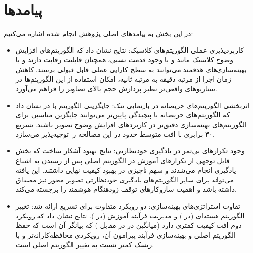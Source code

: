 \section{پیامد‌ها}

در این بخش به پیامد‌های اصلی پژوهش انجام شده اشاره می‌کنیم:

\begin{itemize}
    \item کاربردپذیری عملی الگوریتم‌های کلاسیک: نتایج نشان داد که الگوریتم‌های افزایش وضوح کلاسیک مانند  و  با وجود قدمت نسبی، همچنان قابلیت رقابت دارند و با بهینه‌سازی‌های هدفمند می‌توانند به سطح کارایی عملی قابل قبولی برسند. کاهش زمان اجرا از مرتبه دقیقه به مرتبه ثانیه، امکان استفاده از این الگوریتم‌ها در سناریوهای واقعی‌تر نظیر پردازش حجم بالای تصاویر را فراهم می‌آورد.

    \item اثربخشی الگوریتم‌های حریصانه در بازنمایی تنک: جایگزینی الگوریتم  با  در  نشان داد که الگوریتم‌های حریصانه با پیچیدگی پایین‌تر می‌توانند جایگزین مناسبی برای الگوریتم‌های بهینه‌سازی دقیق‌تر در کاربردهای افزایش وضوح تصویر باشند. تسریع ۳۰ برابری با افت متوسط حدود  در  این مصالحه را توجیه‌پذیر می‌سازد.

    \item وجود تکرارهای بی‌ثمر در یادگیری خودنظارتی: نتایج بهبود  آشکار ساخت که بخش قابل توجهی از تکرارهای آموزش در الگوریتم اصلی پس از رسیدن به اشباع یادگیری انجام می‌شدند و سهم ناچیزی در بهبود کیفیت نهایی داشتند. این یافته می‌تواند برای سایر الگوریتم‌های یادگیری خودنظارتی تصویر-محور نیز مصداق داشته باشد و اهمیت سازوکارهای توقف زودهنگام هوشمند را برجسته می‌کند.

    \item تفاوت استراتژی‌های بهینه‌سازی: دو رویکرد متفاوت برای تسریع ارائه شد: تغییر الگوریتم هسته‌ای (در ) و مدیریت فرآیند آموزش (در ). نتایج نشان داد که رویکرد دوم افت کیفیت کمتری دارد (میانگین  در  در مقابل ) که بیانگر آن است که حفظ الگوریتم اصلی و بهینه‌سازی فرآیند پیرامون آن، رویکردی محافظه‌کارانه‌تر و با ریسک کمتر نسبت به تغییر الگوریتم اصلی است.
\end{itemize}


